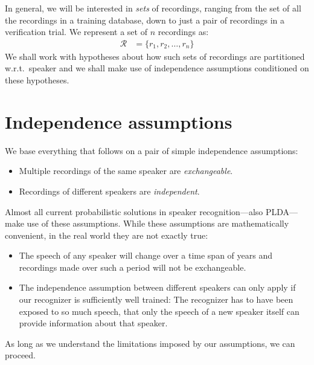\documentclass[a4paper,oneside,12pt,english]{report}
\def\Rset{\mathcal{R}}
\begin{document}
In general, we will be interested in \emph{sets} of recordings, ranging from the set of all the recordings in a training database, down to just a pair of recordings in a verification trial. We represent a set of $n$ recordings as:
\begin{align*}
\Rset &=\{r_1,r_2,\ldots,r_n\}
\end{align*}
We shall work with hypotheses about how such sets of recordings are partitioned w.r.t.\ speaker and we shall make use of independence assumptions conditioned on these hypotheses. 

\section{Independence assumptions}
\label{sec:IS}
We base everything that follows on a pair of simple independence assumptions: 
\begin{itemize}
	\item Multiple recordings of the same speaker are \emph{exchangeable}.
	\item Recordings of different speakers are \emph{independent}. 
\end{itemize}
Almost all current probabilistic solutions in speaker recognition---also PLDA---make use of these assumptions. While these assumptions are mathematically convenient, in the real world they are not exactly true: 
\begin{itemize}
	\item The speech of any speaker will change over a time span of years and recordings made over such a period will not be exchangeable. 
	\item The independence assumption between different speakers can only apply if our recognizer is sufficiently well trained: The recognizer has to have been exposed to so much speech, that only the speech of a new speaker itself can provide information about that speaker.
\end{itemize}
As long as we understand the limitations imposed by our assumptions, we can proceed.  \\
\end{document}
